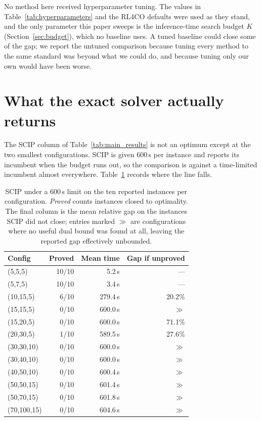 No method here received hyperparameter tuning. The values in
Table~\ref{tab:hyperparameters} and the RL4CO defaults were used as they
stand, and the only parameter this paper sweeps is the inference-time search
budget $K$ (Section~\ref{sec:budget}), which no baseline uses. A tuned
baseline could close some of the gap; we report the untuned comparison
because tuning every method to the same standard was beyond what we could do,
and because tuning only our own would have been worse.

\section{What the exact solver actually returns}
\label{app:scip}

The SCIP column of Table~\ref{tab:main_results} is not an optimum except at
the two smallest configurations. SCIP is given 600\,s per instance and reports
its incumbent when the budget runs out, so the comparison is against a
time-limited incumbent almost everywhere. Table~\ref{tab:scip} records where
the line falls.

\begin{table}[htbp]
\centering
\small
\caption{SCIP under a 600\,s limit on the ten reported instances per
configuration. \emph{Proved} counts instances closed to optimality. The final
column is the mean relative gap on the instances SCIP did not close; entries
marked $\gg$ are configurations where no useful dual bound was found at all,
leaving the reported gap effectively unbounded.}
\label{tab:scip}
\begin{tabular}{@{}lrrr@{}}
\toprule
Config & Proved & Mean time & Gap if unproved \\
\midrule
(5,5,5)     & 10/10 & 5.2\,s   & --- \\
(5,7,5)     & 10/10 & 3.4\,s   & --- \\
(10,15,5)   & 6/10  & 279.4\,s & 20.2\% \\
\midrule
(15,15,5)   & 0/10  & 600.0\,s & $\gg$ \\
(15,20,5)   & 0/10  & 600.0\,s & 71.1\% \\
(20,30,5)   & 1/10  & 589.5\,s & 27.6\% \\
\midrule
(30,30,10)  & 0/10  & 600.0\,s & $\gg$ \\
(30,40,10)  & 0/10  & 600.0\,s & $\gg$ \\
(40,50,10)  & 0/10  & 600.4\,s & $\gg$ \\
\midrule
(50,50,15)  & 0/10  & 601.4\,s & $\gg$ \\
(50,70,15)  & 0/10  & 601.8\,s & $\gg$ \\
(70,100,15) & 0/10  & 604.6\,s & $\gg$ \\
\bottomrule
\end{tabular}
\end{table}

